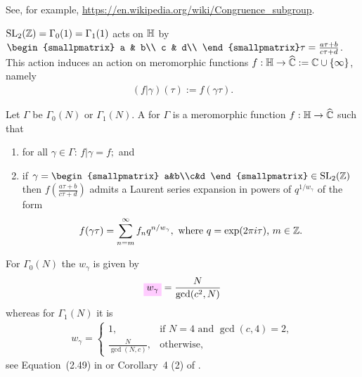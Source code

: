 \documentclass{article}
\begin{document}
\begin{AdditionalInformation}
See, for example,
\url{https://en.wikipedia.org/wiki/Congruence_subgroup}.
\end{AdditionalInformation}

$\SL2Z = \Gamma_0(1) = \Gamma_1(1)$ acts on $\mathbb{H}$ by
$
\begin{smallpmatrix}
  a & b\\
  c & d\\
\end{smallpmatrix} \tau
=
\frac{a \tau + b}{c \tau + d}
$.
%
This action induces an action on meromorphic functions
$f:\mathbb{H}\to\widehat{\mathbb{C}}:=\mathbb{C}\cup\left\{\infty\right\}$, namely
\begin{gather*}
  (f|\gamma)(\tau) := f(\gamma \tau).
\end{gather*}
%

Let $\Gamma$ be $\Gamma_0(N)$ or $\Gamma_1(N)$.
A  for $\Gamma$ is a meromorphic
function $f:\mathbb{H}\to\widehat{\mathbb{C}}$ such that
\begin{enumerate}
\item for all $\gamma \in \Gamma$:
  \begin{math}
    f|\gamma = f;
  \end{math} and
\item if
  $\gamma =
  \begin{smallpmatrix}
    a&b\\c&d
  \end{smallpmatrix}
  \in \mathrm{SL}_2(\setZ)$ then $f\left(\frac{a \tau + b}{c \tau + d}\right)$
  admits a Laurent series expansion in powers of $q^{1/w_\gamma}$ of the form
  \begin{gather}
    \label{eq:f(gamma*tau)-expansion}
    f(\gamma\tau) = \sum_{n=m}^\infty f_n q^{n/w_\gamma},
    \text{ where $q=\exp(2\pi i\tau)$, $m \in \mathbb{Z}$.}
  \end{gather}
\end{enumerate}

For $\Gamma_0(N)$ the  $w_\gamma$ is given by
\begin{gather}
  \defineNotation[w-gamma]{w_\gamma} = \frac{N}{\gcd(c^2, N)}
  \label{eq:width0}
\end{gather}
whereas for $\Gamma_1(N)$ it is
\begin{gather}
  w_\gamma
  =
  \begin{cases}
    1,                   & \text{if $N=4$ and $\gcd(c,4)=2$},\\
    \frac{N}{\gcd(N,c)}, & \text{otherwise},
  \end{cases}
  \label{eq:width1}
\end{gather}
see Equation~(2.49) in
\cite{ChenDuZhao_FindingModularFunctionsRamanujan_2019} or Corollary~4
(2) of \cite{ChoKooPark_ArithmeticRamanujanGoellnitzGordon_2009}.
\end{document}
